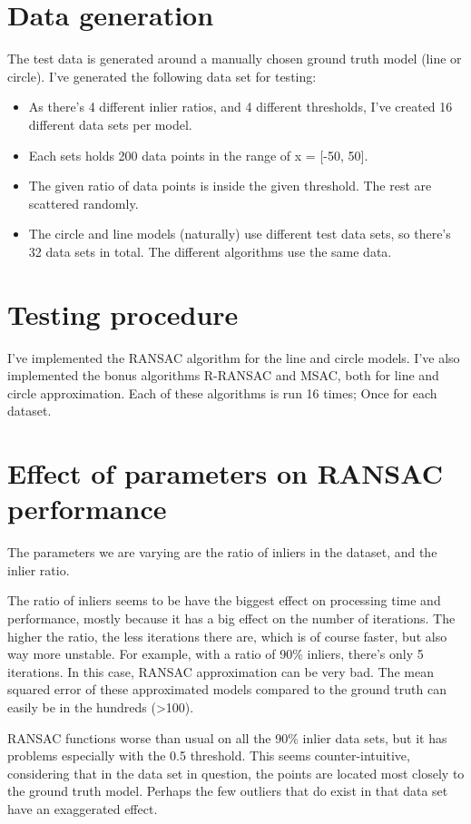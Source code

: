 \section{Data generation}

The test data is generated around a manually chosen ground truth model (line or circle).
I've generated the following data set for testing:
\begin{itemize}
  \item As there's 4 different inlier ratios, and 4 different thresholds, I've
    created 16 different data sets per model.
  \item Each sets holds 200 data points in the range of x = [-50, 50].
  \item The given ratio of data points is inside the given threshold. The rest
    are scattered randomly.
  \item The circle and line models (naturally) use different test data sets, so
    there's 32 data sets in total. The different algorithms use the same data.
\end{itemize}

\section{Testing procedure}

I've implemented the RANSAC algorithm for the line and circle models. I've also
implemented the bonus algorithms R-RANSAC and MSAC, both for line and circle
approximation. Each of these algorithms is run 16 times; Once for each dataset.

\section{Effect of parameters on RANSAC performance}

The parameters we are varying are the ratio of inliers in the dataset, and the
inlier ratio.

The ratio of inliers seems to be have the biggest effect on processing time and
performance, mostly because it has a big effect on the number of iterations.
The higher the ratio, the less iterations there are, which is of course faster,
but also way more unstable. For example, with a ratio of 90\% inliers, there's
only 5 iterations. In this case, RANSAC approximation can be very bad. The mean
squared error of these approximated models compared to the ground truth can
easily be in the hundreds (>100).

RANSAC functions worse than usual on all the 90\% inlier data sets, but it has
problems especially with the 0.5 threshold. This seems counter-intuitive,
considering that in the data set in question, the points are located most
closely to the ground truth model. Perhaps the few outliers that do exist in
that data set have an exaggerated effect.

